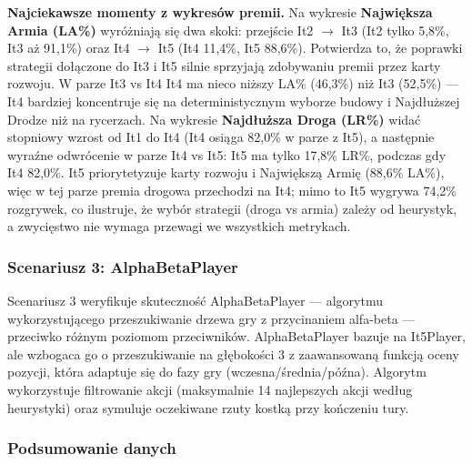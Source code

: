 \documentclass[polish,inz,longabstract]{iithesis}
\begin{document}
\textbf{Najciekawsze momenty z wykresów premii.} Na wykresie \textbf{Największa Armia (LA\%)} wyróżniają się dwa skoki: przejście It2 $\rightarrow$ It3 (It2 tylko 5,8\%, It3 aż 91,1\%) oraz It4 $\rightarrow$ It5 (It4 11,4\%, It5 88,6\%). Potwierdza to, że poprawki strategii dołączone do It3 i It5 silnie sprzyjają zdobywaniu premii przez karty rozwoju. W parze It3 vs It4 It4 ma nieco niższy LA\% (46,3\%) niż It3 (52,5\%) --- It4 bardziej koncentruje się na deterministycznym wyborze budowy i Najdłuższej Drodze niż na rycerzach. Na wykresie \textbf{Najdłuższa Droga (LR\%)} widać stopniowy wzrost od It1 do It4 (It4 osiąga 82,0\% w parze z It5), a następnie wyraźne odwrócenie w parze It4 vs It5: It5 ma tylko 17,8\% LR\%, podczas gdy It4 82,0\%. It5 priorytetyzuje karty rozwoju i Największą Armię (88,6\% LA\%), więc w tej parze premia drogowa przechodzi na It4; mimo to It5 wygrywa 74,2\% rozgrywek, co ilustruje, że wybór strategii (droga vs armia) zależy od heurystyk, a zwycięstwo nie wymaga przewagi we wszystkich metrykach.

\subsubsection{Scenariusz 3: AlphaBetaPlayer}

Scenariusz 3 weryfikuje skuteczność AlphaBetaPlayer --- algorytmu wykorzystującego przeszukiwanie drzewa gry z przycinaniem alfa-beta --- przeciwko różnym poziomom przeciwników. AlphaBetaPlayer bazuje na It5Player, ale wzbogaca go o przeszukiwanie na głębokości 3 z zaawansowaną funkcją oceny pozycji, która adaptuje się do fazy gry (wczesna/średnia/późna). Algorytm wykorzystuje filtrowanie akcji (maksymalnie 14 najlepszych akcji według heurystyki) oraz symuluje oczekiwane rzuty kostką przy kończeniu tury.

\subsubsection{Podsumowanie danych}

\begin{table}[h]
\centering
\caption{Wyniki AlphaBetaPlayer vs przeciwnicy – skuteczność i tempo}
\medskip
\label{tab:scenario3-main}
\end{table}
\end{document}

